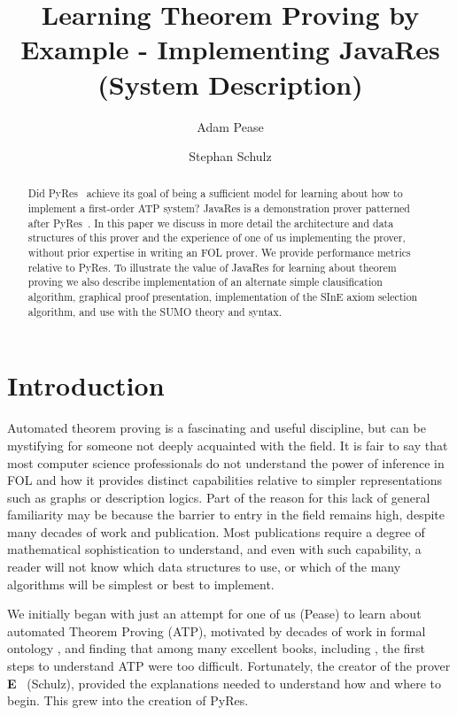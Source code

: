\documentclass{llncs}
\title{Learning Theorem Proving by Example - Implementing JavaRes (System Description)}
\author{Adam Pease\inst{2}
        \and Stephan Schulz\inst{1}
  }
\institute{
  Articulate Software, USA,
  \email{\tt apease@articulatesoftware.com}
  \and
  DHBW Stuttgart, Germany,
  \email{\tt schulz@eprover.org}
}
\begin{document}
\maketitle


\begin{abstract}
  Did PyRes~\cite{SP:IJCAR-2020} achieve its goal of being a
  sufficient model for learning about how to implement a first-order
  ATP system?  JavaRes is a demonstration prover patterned after
  PyRes~\cite{SP:IJCAR-2020}.  In this paper we discuss in more detail
  the architecture and data structures of this prover and the
  experience of one of us implementing the prover, without prior
  expertise in writing an FOL prover.  We provide performance metrics
  relative to PyRes.  To illustrate the
  value of JavaRes for learning about theorem proving we also describe
  implementation of an alternate simple clausification algorithm,
  graphical proof presentation, implementation of the SInE axiom
  selection algorithm, and use with the SUMO theory and syntax.
\end{abstract}

\section{Introduction}

Automated theorem proving is a fascinating and useful discipline, but
can be mystifying for someone not deeply acquainted with the field.
It is fair to say that most computer science professionals do not
understand the power of inference in FOL and how it provides distinct
capabilities relative to simpler representations such as graphs or
description logics.  Part of the reason for this lack of general
familiarity may be because the barrier to entry in the field remains
high, despite many decades of work and publication.  Most publications
require a degree of mathematical sophistication to understand, and
even with such capability, a reader will not know which data
structures to use, or which of the many algorithms will be simplest or
best to implement.

We initially began with just an attempt for one of us (Pease) to learn
about automated Theorem Proving (ATP), motivated by decades of work in
formal ontology \cite{np01,p11}, and finding that among many excellent
books, including \cite{Harrison:HPL-2009}, the first steps to
understand ATP were too difficult.  Fortunately, the creator of the
prover \textbf{E}~\cite{Schulz:AICOM-2002,SCV:CADE-2019} (Schulz),
provided the explanations needed to understand how and where to begin.
This grew into the creation of PyRes.
\end{document}
